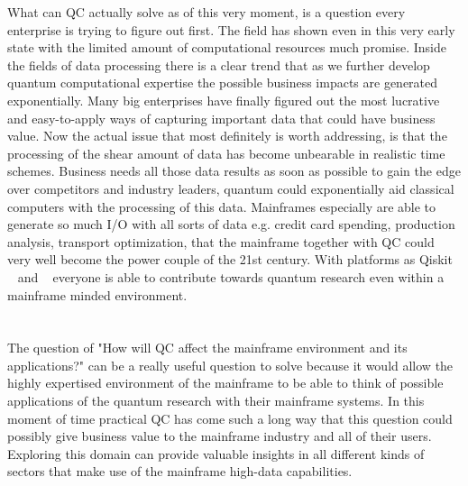 What can QC actually solve as of this very moment, is a question every enterprise is trying to figure out first. The field has shown even in this very early state with the limited amount of computational resources much promise. Inside the fields of data processing there is a clear trend that as we further develop quantum computational expertise the possible business impacts are generated exponentially. Many big enterprises have finally figured out the most lucrative and easy-to-apply ways of capturing important data that could have business value. Now the actual issue that most definitely is worth addressing, is that the processing of the shear amount of data has become unbearable in realistic time schemes. Business needs all those data results as soon as possible to gain the edge over competitors and industry leaders, quantum could exponentially aid classical computers with the processing of this data. Mainframes especially are able to generate so much I/O with all sorts of data e.g. credit card spending, production analysis, transport optimization, that the mainframe together with QC could very well become the power couple of the 21st century. With platforms as Qiskit ~\textcite{Qiskit} and ~\textcite{Cirq} everyone is able to contribute towards quantum research even within a mainframe minded environment.

\section{}
\label{sec:onderzoeksvraag}

The question of "How will QC affect the mainframe environment and its applications?" can be a really useful question to solve because it would allow the highly expertised environment of the mainframe to be able to think of possible applications of the quantum research with their mainframe systems. In this moment of time practical QC has come such a long way that this question could possibly give business value to the mainframe industry and all of their users. Exploring this domain can provide valuable insights in all different kinds of sectors that make use of the mainframe high-data capabilities.

\section{}
\label{sec:onderzoeksdoelstelling}

